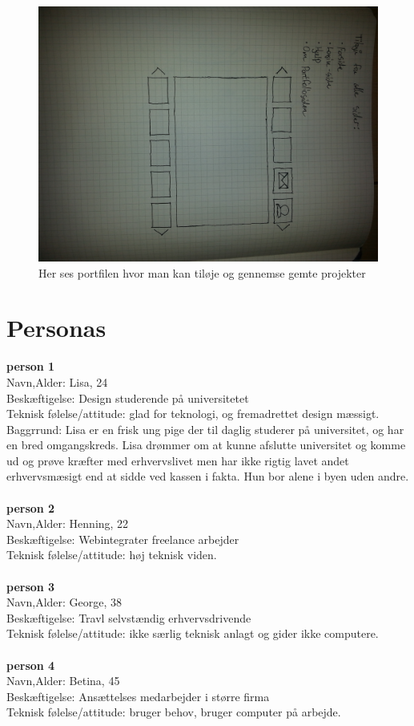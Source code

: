 \documentclass[a4paper,titlepage,fleqn,12pt]{article}
\begin{document}
\begin{figure}[H]
\includegraphics[width=\textwidth]{mainside.jpg}
\caption{Her ses portfilen hvor man kan tiløje og gennemse gemte projekter}
\end{figure}

\section{Personas}
\textbf{person 1}\\
Navn,Alder: Lisa, 24\\
Beskæftigelse:	Design studerende på universitetet\\
Teknisk følelse/attitude: glad for teknologi, og fremadrettet design mæssigt.\\
Baggrrund: Lisa er en frisk ung pige der til daglig studerer på universitet, og har en bred omgangskreds. Lisa drømmer om at kunne afslutte universitet og komme ud og prøve kræfter med erhvervslivet men har ikke rigtig lavet andet erhvervsmæsigt end at sidde ved kassen i fakta. Hun bor alene i byen uden andre.
\\\\
\textbf{person 2}\\
Navn,Alder: Henning, 22\\
Beskæftigelse: Webintegrater freelance arbejder \\
Teknisk følelse/attitude: høj teknisk viden.
\\\\
\textbf{person 3}\\
Navn,Alder: George, 38\\
Beskæftigelse: Travl selvstændig erhvervsdrivende\\
Teknisk følelse/attitude: ikke særlig teknisk anlagt og gider ikke computere.
\\\\
\textbf{person 4}\\
Navn,Alder: Betina, 45\\
Beskæftigelse: Ansættelses medarbejder i større firma\\
Teknisk følelse/attitude: bruger behov, bruger computer på arbejde.
\\\\
\end{document}
